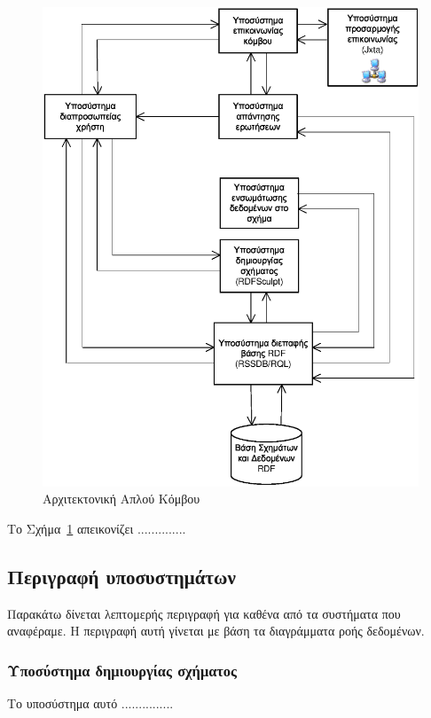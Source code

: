 \begin{figure}[!ht] \centering
	\includegraphics{figures/peerArchitecture.eps} 
    \caption{Αρχιτεκτονική Απλού Κόμβου}
    \label{figure4.1}
\end{figure} 

Το Σχήμα~\ref{figure4.1} απεικονίζει ..............


\subsection{Περιγραφή υποσυστημάτων}
Παρακάτω δίνεται λεπτομερής περιγραφή για καθένα από τα συστήματα
που αναφέραμε. Η περιγραφή αυτή γίνεται με βάση τα διαγράμματα
ροής δεδομένων.

\subsubsection{Υποσύστημα δημιουργίας σχήματος}
Το υποσύστημα αυτό ...............